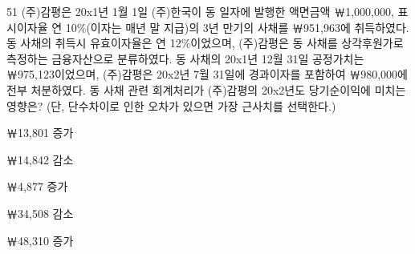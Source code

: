 \begin{question}{51}
(주)감평은 20x1년 1월 1일 (주)한국이 동 일자에 발행한 액면금액 ￦1,000,000, 표시이자율 연 10\%(이자는 매년 말 지급)의 3년 만기의 사채를 ￦951,963에 취득하였다. 동 사채의 취득시 유효이자율은 연 12\%이었으며,
(주)감평은 동 사채를 상각후원가로 측정하는 금융자산으로 분류하였다. 동 사채의 20x1년 12월 31일 공정가치는 ￦975,123이었으며, (주)감평은 20x2년 7월 31일에 경과이자를 포함하여 ￦980,000에 전부 처분하였다. 동 사채 관련 회계처리가 (주)감평의 20x2년도 당기순이익에 미치는 영향은? (단, 단수차이로 인한 오차가 있으면 가장 근사치를 선택한다.) \par
\begin{choices}
  \item ￦13,801 증가
  \item ￦14,842 감소
  \item ￦4,877 증가
  \item ￦34,508 감소
  \item ￦48,310 증가
\end{choices}
\end{question}
